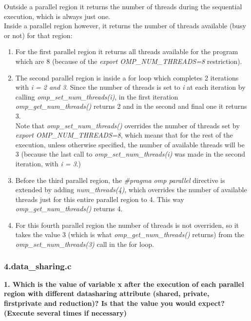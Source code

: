 \documentclass[12]{article}
\begin{document}
Outside a parallel region it returns the number of threads during the sequential execution, which is always just one.
\\
Inside a parallel region however, it returns the number of threads available (busy or not) for that region:
\begin{enumerate}
    \item For the first parallel region it returns all threads available for the program which are 8 (because of the \textit{export OMP\_NUM\_THREADS=8} restriction).
    \item  The second parallel region is inside a for loop which completes 2 iterations with \textit{i = 2 and 3}. Since the number of threads is set to \textit{i} at each iteration by calling \textit{omp\_set\_num\_threads(i)}, in the first iteration \textit{omp\_get\_num\_threads()} returns 2 and in the second and final one it returns 3. \\ Note that \textit{omp\_set\_num\_threads()} overrides the number of threads set by \textit{export OMP\_NUM\_THREADS=8}, which means that for the rest of the execution, unless otherwise specified, the number of available threads will be 3 (because the last call to \textit{omp\_set\_num\_threads(i)} was made in the second iteration, with \textit{i = 3}.)  
    \item Before the third parallel region, the \textit{\#pragma omp parallel} directive is extended by adding \textit{num\_threads(4)}, which overrides the number of available threads just for this entire parallel region to 4. This way \textit{omp\_get\_num\_threads()} returns 4.
    \item For this fourth parallel region the number of threads is not overriden, so it takes the value 3 (which is what \textit{omp\_get\_num\_threads()} returns) from the \textit{omp\_set\_num\_threads(3)} call in the for loop.
\end{enumerate}

\subsubsection{4.data\_sharing.c}
\textbf{1. Which is the value of variable x after the execution of each parallel region with different datasharing
attribute (shared, private, firstprivate and reduction)? Is that the value you would expect? (Execute several times if necessary)}
\end{document}
